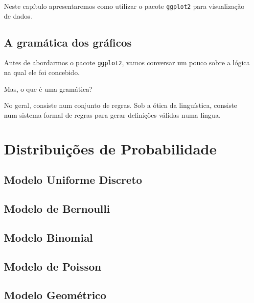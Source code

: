 \documentclass[
  12pt,
  brazilian,
]{book}
\begin{document}
Neste capítulo apresentaremos como utilizar o pacote \texttt{ggplot2} para visualização de dados.

\hypertarget{a-gramuxe1tica-dos-gruxe1ficos}{%
\section{A gramática dos gráficos}\label{a-gramuxe1tica-dos-gruxe1ficos}}

Antes de abordarmos o pacote \texttt{ggplot2}, vamos conversar um pouco sobre a lógica na qual ele foi concebido.

Mas, o que é uma gramática?

No geral, consiste num conjunto de regras. Sob a ótica da linguística, consiste num sistema formal de regras para gerar definições válidas numa língua.

\hypertarget{distribuiuxe7uxf5es-de-probabilidade}{%
\chapter{Distribuições de Probabilidade}\label{distribuiuxe7uxf5es-de-probabilidade}}

\hypertarget{modelo-uniforme-discreto}{%
\section{Modelo Uniforme Discreto}\label{modelo-uniforme-discreto}}

\hypertarget{modelo-de-bernoulli}{%
\section{Modelo de Bernoulli}\label{modelo-de-bernoulli}}

\hypertarget{modelo-binomial}{%
\section{Modelo Binomial}\label{modelo-binomial}}

\hypertarget{modelo-de-poisson}{%
\section{Modelo de Poisson}\label{modelo-de-poisson}}

\hypertarget{modelo-geomuxe9trico}{%
\section{Modelo Geométrico}\label{modelo-geomuxe9trico}}
\end{document}
